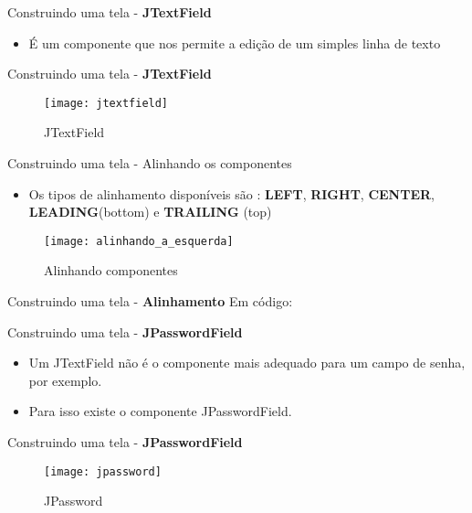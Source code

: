 \documentclass[10pt]{beamer}
\begin{document}
\begin{frame}{Construindo uma tela - \textbf{JTextField}}
\begin{itemize}
\item É um componente que nos permite a edição de um simples linha de texto
\end{itemize}
\end{frame}{}

\begin{frame}{Construindo uma tela - \textbf{JTextField}}
\begin{figure}[!htb]
    \centering
    \texttt{[image: jtextfield]}
    \caption{JTextField}
    \label{figRotulo}
  \end{figure}
\end{frame}{}

\begin{frame}{Construindo uma tela - Alinhando os componentes}
\begin{itemize}
\item Os tipos de alinhamento disponíveis são : \textbf{LEFT}, \textbf{RIGHT}, \textbf{CENTER}, \textbf{LEADING}(bottom) e \textbf{TRAILING} (top)
\end{itemize}
\begin{figure}[!htb]
    \centering
    \texttt{[image: alinhando\_a\_esquerda]}
    \caption{Alinhando componentes}
    \label{figRotulo}
  \end{figure}
\end{frame}{}

\begin{frame}{Construindo uma tela - \textbf{Alinhamento}}
Em código:

\end{frame}{}

\begin{frame}{Construindo uma tela - \textbf{JPasswordField}}
\begin{itemize}
\item Um JTextField não é o componente mais adequado para um campo de senha, por exemplo.
\item Para isso existe o componente JPasswordField.
\end{itemize}
\end{frame}{}

\begin{frame}{Construindo uma tela - \textbf{JPasswordField}} 
\begin{figure}[!htb]
    \centering
    \texttt{[image: jpassword]}
    \caption{JPassword}
    \label{figRotulo}
  \end{figure}
\end{frame}{}
\end{document}
